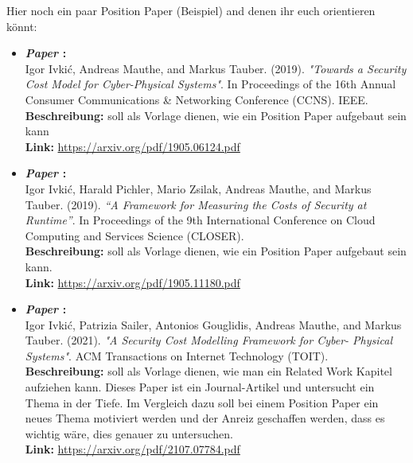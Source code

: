 \vspace{10pt}
Hier noch ein paar Position Paper (Beispiel) and denen ihr euch orientieren könnt:
\begin{itemize}
	\item\textbf{\textit{Paper \cite{ref01}}:} \\
	Igor Ivki\'c, Andreas Mauthe, and Markus Tauber. (2019). 
	\textit{"Towards a Security Cost Model for Cyber-Physical Systems"}. In Proceedings of the 16th Annual Consumer Communications \& Networking Conference (CCNS). 
	IEEE.\\
	\textbf{Beschreibung:} soll als Vorlage dienen, wie ein Position Paper aufgebaut sein kann\\
	\textbf{Link:} \href{https://arxiv.org/pdf/1905.06124.pdf}{https://arxiv.org/pdf/1905.06124.pdf}\\
	\item\textbf{\textit{Paper \cite{ref02}}:} \\
	Igor Ivki\'c, Harald Pichler, Mario Zsilak, Andreas Mauthe, and Markus Tauber. (2019). 
	\textit{“A Framework for Measuring the Costs of Security at Runtime”}. 
	In Proceedings of the 9th International Conference on Cloud Computing and Services Science (CLOSER).\\
	\textbf{Beschreibung:} soll als Vorlage dienen, wie ein Position Paper aufgebaut sein kann. \\
	\textbf{Link:} \href{https://arxiv.org/pdf/1905.11180.pdf}{https://arxiv.org/pdf/1905.11180.pdf}\\
	
	\item\textbf{\textit{Paper \cite{ref03}}:} \\
	Igor Ivki\'c, Patrizia Sailer, Antonios Gouglidis, Andreas Mauthe, and Markus Tauber. (2021).
	\textit{"A Security Cost Modelling Framework for Cyber- Physical Systems"}.
	ACM Transactions on Internet Technology (TOIT).\\
	\textbf{Beschreibung:} soll als Vorlage dienen, wie man ein Related Work Kapitel aufziehen kann. Dieses Paper ist ein Journal-Artikel und untersucht ein Thema in der Tiefe. Im Vergleich dazu soll bei einem Position Paper ein neues Thema motiviert werden und der Anreiz geschaffen werden, dass es wichtig wäre, dies genauer zu untersuchen. \\
	\textbf{Link:} \href{https://arxiv.org/pdf/2107.07784.pdf}{https://arxiv.org/pdf/2107.07784.pdf}\\
\end{itemize}

